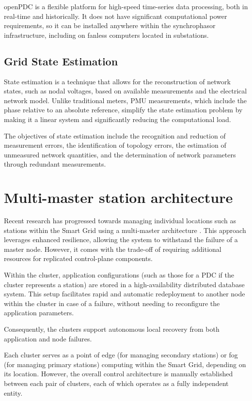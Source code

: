 openPDC is a flexible platform for high-speed time-series data processing, both in real-time and historically. It does not have significant computational power requirements, so it can be installed anywhere within the synchrophasor infrastructure, including on fanless computers located in substations.

\subsection{Grid State Estimation}
State estimation is a technique that allows for the reconstruction of network states, such as nodal voltages, based on available measurements and the electrical network model. Unlike traditional meters, PMU measurements, which include the phase relative to an absolute reference, simplify the state estimation problem by making it a linear system and significantly reducing the computational load. 

The objectives of state estimation include the recognition and reduction of measurement errors, the identification of topology errors, the estimation of unmeasured network quantities, and the determination of network parameters through redundant measurements.

\section{Multi-master station architecture}
Recent research has progressed towards managing individual locations such as stations within the Smart Grid using a multi-master architecture \cite{a2-1}\cite{a2-2}. This approach leverages enhanced resilience, allowing the system to withstand the failure of a master node. However, it comes with the trade-off of requiring additional resources for replicated control-plane components.

Within the cluster, application configurations (such as those for a PDC if the cluster represents a station) are stored in a high-availability distributed database system. This setup facilitates rapid and automatic redeployment to another node within the cluster in case of a failure, without needing to reconfigure the application parameters.

Consequently, the clusters support autonomous local recovery from both application and node failures.

Each cluster serves as a point of edge (for managing secondary stations) or fog (for managing primary stations) computing within the Smart Grid, depending on its location. However, the overall control architecture is manually established between each pair of clusters, each of which operates as a fully independent entity.

